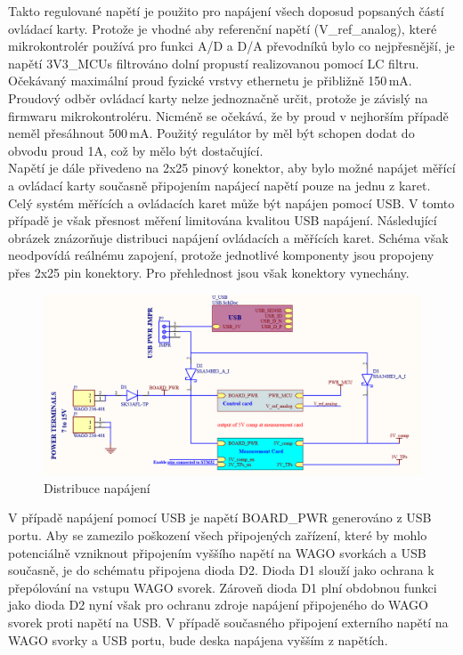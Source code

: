     Takto regulované napětí je použito pro napájení všech doposud popsaných částí ovládací karty.
    Protože je vhodné aby referenční napětí (V\_ref\_analog),
    které mikrokontrolér používá  pro funkci A/D a D/A převodníků bylo co nejpřesnější, je
    napětí 3V3\_MCUs filtrováno dolní propustí realizovanou pomocí LC filtru.\\

    Očekávaný maximální proud fyzické vrstvy ethernetu je přibližně 150\,mA.
    Proudový odběr ovládací karty nelze jednoznačně určit,
    protože je závislý na firmwaru mikrokontroléru.
    Nicméně se očekává, že by proud v nejhorším případě neměl přesáhnout 500\,mA. 
    Použitý regulátor by měl být schopen dodat do obvodu proud 1A, což by
    mělo být dostačující.\\ 
    
    Napětí je dále přivedeno na 2x25 pinový konektor,
    aby bylo možné napájet měřící a ovládací karty současně připojením napájecí napětí pouze
    na jednu z karet.\\

    Celý systém měřících a ovládacích karet může být napájen pomocí USB. V tomto případě je však přesnost
    měření limitována kvalitou USB napájení. Následující obrázek znázorňuje distribuci napájení
    ovládacích a měřících karet. Schéma však neodpovídá reálnému zapojení, protože jednotlivé
    komponenty jsou propojeny přes 2x25 pin konektory. Pro přehlednost jsou však konektory vynechány.
    \clearpage


    \begin{figure}[ht!]
        \centering
        \includegraphics[width = 1\textwidth]{obrazky/USB_power_distr.png}
        \caption{Distribuce napájení}
        \label{fig:Distribuce napájení}
    \end{figure}

    V případě napájení pomocí USB je napětí BOARD\_PWR generováno z USB portu.
    Aby se zamezilo poškození všech připojených zařízení, které by mohlo potenciálně vzniknout připojením
    vyššího napětí na WAGO svorkách a USB současně, je do schématu připojena dioda D2. Dioda D1
    slouží jako ochrana k přepólování na vstupu WAGO svorek. Zároveň dioda D1 plní obdobnou funkci jako dioda D2
    nyní však pro ochranu zdroje napájení připojeného do WAGO svorek proti napětí na USB.
    V případě současného připojení externího napětí na WAGO svorky a USB portu, bude deska napájena
    vyšším z napětích.\\

